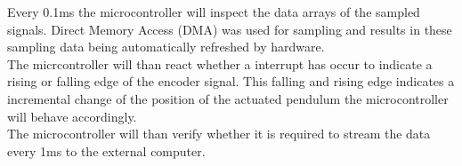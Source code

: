 Every 0.1ms the microcontroller will inspect the data arrays of the sampled signals. Direct Memory Access (DMA) was used for sampling and results in these sampling data being automatically refreshed by hardware.\\

The micrcontroller will than react whether a interrupt has occur to indicate a rising or falling edge of the encoder signal. This falling and rising edge indicates a incremental change of the position of the actuated pendulum the microcontroller will behave accordingly.\\

The microcontroller will than verify whether it is required to stream the data every 1ms to the external computer. 

